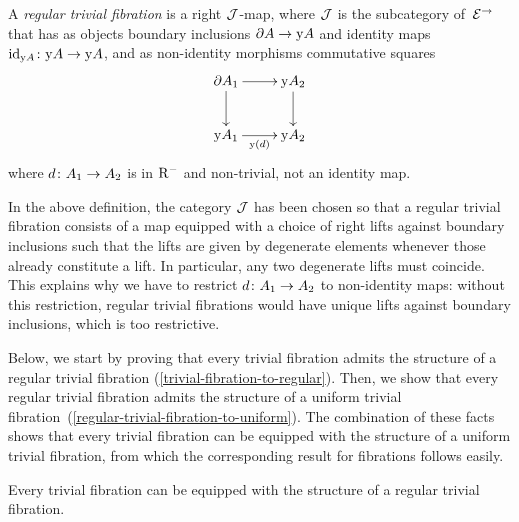 \documentclass[reqno,10pt,a4paper,oneside,draft]{amsart}
\begin{document}
{{\begin{definition}
A \emph{regular trivial fibration} is a right $\cal{J}$-map, where $\cal{J}$ is the subcategory of~$\catE^{\to}$ that has as objects boundary inclusions $\partial A \to \yon A$ and identity maps $\id_{\yon A} \co \yon A \to \yon A$, and as non-identity morphisms commutative squares
\[
\xymatrix{
  \partial A_1
  \ar[r]
  \ar[d]
&
  \yon A_2
  \ar[d]
\\
  \yon A_1
  \ar[r]_{\yon(d)}
&
  \yon A_2
}
\]
where $d \co A_1 \to A_2$ is in $\Rm$ and non-trivial, \ie not an identity map.
\end{definition}

In the above definition, the category $\cal{J}$ has been chosen so that a regular trivial fibration consists of a map equipped with a choice of right lifts against boundary inclusions such that the lifts are given by degenerate elements whenever those already constitute a lift.
In particular, any two degenerate lifts must coincide.
This explains why we have to restrict $d \co A_1 \to A_2$ to non-identity maps: without this restriction, regular trivial fibrations would have unique lifts against boundary inclusions, which is too restrictive.

Below, we start by proving that every trivial fibration admits the structure of a regular trivial fibration (\cref{trivial-fibration-to-regular}).
Then, we show that every regular trivial fibration admits the structure of a uniform trivial fibration~(\cref{regular-trivial-fibration-to-uniform}).
The combination of these facts shows that every trivial fibration can be equipped with the structure of a uniform trivial fibration, from which the corresponding result for fibrations follows easily.

\begin{proposition} \label{trivial-fibration-to-regular}
Every trivial fibration can be equipped with the structure of a regular trivial fibration.
\end{proposition}

}}
\end{document}
